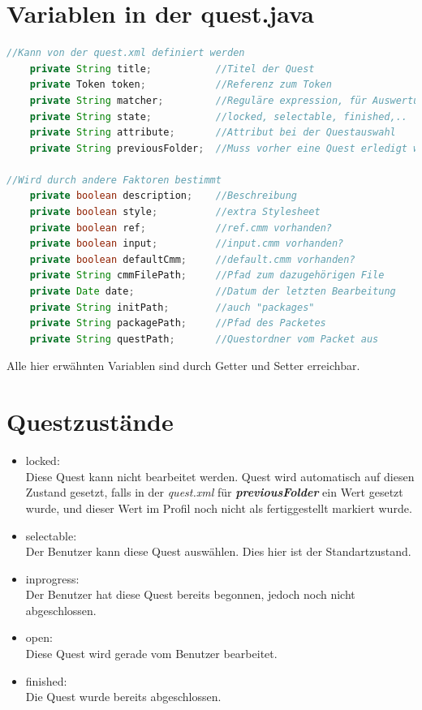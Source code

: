 \section{Variablen in der quest.java}
\begin{lstlisting}[language=JAVA]
//Kann von der quest.xml definiert werden
	private String title;			//Titel der Quest		
	private Token token;			//Referenz zum Token
	private String matcher;			//Reguläre expression, für Auswertung benötigt
	private String state;			//locked, selectable, finished,..
	private String attribute;		//Attribut bei der Questauswahl
	private String previousFolder;	//Muss vorher eine Quest erledigt werden

//Wird durch andere Faktoren bestimmt
	private boolean description;	//Beschreibung
	private boolean style;			//extra Stylesheet
	private boolean ref;			//ref.cmm vorhanden?
	private boolean input;			//input.cmm vorhanden?	
	private boolean defaultCmm;		//default.cmm vorhanden?
	private String cmmFilePath;		//Pfad zum dazugehörigen File	
	private Date date;				//Datum der letzten Bearbeitung
	private String initPath;		//auch "packages"
	private String packagePath;		//Pfad des Packetes
	private String questPath;		//Questordner vom Packet aus

\end{lstlisting}
Alle hier erwähnten Variablen sind durch Getter und Setter erreichbar.


\section{Questzustände}
\begin{itemize}
\item locked:\\ Diese Quest kann nicht bearbeitet werden. Quest wird automatisch auf diesen Zustand gesetzt, falls in der \textit{quest.xml} für \textit{\textbf{previousFolder}} ein Wert gesetzt wurde, und dieser Wert im Profil noch nicht als fertiggestellt markiert wurde.
\item selectable:\\ Der Benutzer kann diese Quest auswählen. Dies hier ist der Standartzustand.
\item inprogress:\\ Der Benutzer hat diese Quest bereits begonnen, jedoch noch nicht abgeschlossen.
\item open:\\ Diese Quest wird gerade vom Benutzer bearbeitet.
\item finished:\\ Die Quest wurde bereits abgeschlossen.
\end{itemize}

